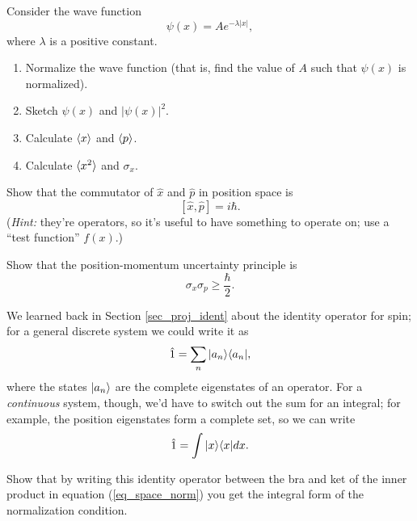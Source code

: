 \begin{problem}
\label{prob_dealing_with_wave_functions}

Consider the wave function
\[
\psi(x) = A e^{-\lambda |x|},
\]
where $\lambda$ is a positive constant.
\begin{enumerate}[label=(\alph*)]
\item Normalize the wave function (that is, find the value of $A$ such that $\psi(x)$ is normalized).

\item Sketch $\psi(x)$ and $|\psi(x)|^2$.

\item Calculate $\langle x \rangle$ and $\langle p \rangle$.

\item Calculate $\langle x^2 \rangle$ and $\sigma_x$.

\end{enumerate}
\end{problem}

\begin{problem}
\label{prob_commutator}

Show that the commutator of $\hat{x}$ and $\hat{p}$ in position space is 
\[
[\hat{x}, \hat{p}] = i\hbar.
\]
(\emph{Hint:} they're operators, so it's useful to have something to operate on; use a ``test function'' $f(x)$.)

\end{problem}

\begin{problem}
\label{prob_uncertainty}

Show that the position-momentum uncertainty principle is
\[
\sigma_x \sigma_p \ge \frac{\hbar}{2}.
\]
\end{problem}

\begin{problem}[Normalization]
\label{prob_space_norm}

We learned back in Section \ref{sec_proj_ident} about the identity operator for spin; for a general discrete system we could write it as
\begin{equation}
\hat{1} = \sum_n | a_n \rangle\langle a_n |,
\end{equation}
where the states $| a_n \rangle$ are the complete eigenstates of an operator.  For a \emph{continuous} system, though, we'd have to switch out the sum for an integral; for example, the position eigenstates form a complete set, so we can write
\begin{equation}
\hat{1} = \int | x \rangle\langle x | dx.
\end{equation}

Show that by writing this identity operator between the bra and ket of the inner product in equation (\ref{eq_space_norm}) you get the integral form of the normalization condition.

\end{problem}
